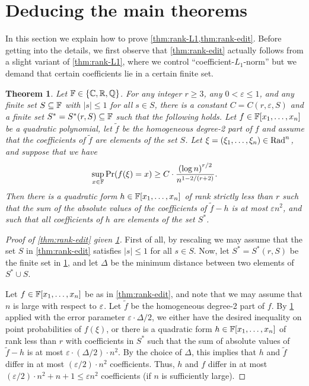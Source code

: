 \documentclass{daj}
\theoremstyle{plain}
\newtheorem{thm}{Theorem}[section]
\theoremstyle{plain}
\theoremstyle{plain}
\theoremstyle{plain}
\theoremstyle{definition}
\theoremstyle{plain}
\theoremstyle{plain}
\theoremstyle{definition}
\theoremstyle{definition}
\theoremstyle{plain}
\let\originalleft\left
\let\originalright\right
\renewcommand{\left}{\mathopen{}\mathclose\bgroup\originalleft}
\renewcommand{\right}{\aftergroup\egroup\originalright}
\begin{document}
\section{Deducing the main theorems\label{sec:rank}}

In this section we explain how to prove \cref{thm:rank-L1,thm:rank-edit}. Before getting into the details, we first observe that \cref{thm:rank-edit} actually follows from a slight variant of \cref{thm:rank-L1}, where we control ``coefficient-$L_1$-norm'' but we demand that certain coefficients lie in a certain finite set.

\begin{thm}
\label{thm:rank-L1-set}Let $\mathbb{F}\in \lbrace \mathbb{C},\mathbb{R}, \mathbb{Q}\rbrace$. For any integer $r\geq 3$, any $0< \varepsilon\leq 1$, and any finite set $S\subseteq \mathbb{F}$ with $\vert s\vert\leq 1$ for all $s\in S$, there is a constant $C=C(r,\varepsilon, S)$ and a finite set $S^*=S^*(r, S)\subseteq \mathbb{F}$ such that the following holds. Let $f\in \mathbb{F}[x_1,\dots,x_n]$ be a quadratic polynomial, let $\tilde{f}$ be the homogeneous degree-2 part of $f$ and assume that the coefficients of $\tilde{f}$ are elements of the set $S$. Let $\xi=(\xi_1,\dots,\xi_n)\in \operatorname{Rad}^n$, and suppose that we have
\[\sup_{x\in \FF}\Pr\left(f(\xi)=x\right)\geq C\cdot \frac{\left(\log n\right)^{r/2}}{n^{1-2/\left(r+2\right)}}.\]
Then there is a quadratic form $h\in\FF\left[x_{1},\dots,x_{n}\right]$
of rank strictly less than $r$ such that the sum of the absolute values of the coefficients of $\tilde{f}-h$ is at most $\varepsilon n^2$, and such that all coefficients of $h$ are elements of the set $S^*$.
\end{thm}

\begin{proof}[Proof of \cref{thm:rank-edit} given \cref{thm:rank-L1-set}]
First of all, by rescaling we may assume that the set $S$ in \cref{thm:rank-edit} satisfies $\vert s\vert\leq 1$ for all $s\in S$. Now, let $S^*=S^*(r,S)$ be the finite set in \cref{thm:rank-L1-set}, and let $\Delta$ be the minimum distance between two elements of $S^*\cup S$.

Let $f\in \mathbb{F}[x_1,\dots,x_n]$ be as in \cref{thm:rank-edit}, and note that we may assume that $n$ is large with respect to $\varepsilon$. Let $\tilde{f}$ be the homogeneous degree-2 part of $f$. By \cref{thm:rank-L1-set} applied with the error parameter $\varepsilon\cdot \Delta/2$, we either have the desired inequality on point probabilities of $f(\xi)$, or there is a quadratic form $h\in\FF\left[x_{1},\dots,x_{n}\right]$ of rank less than $r$ with coefficients in $S^*$ such that the sum of absolute values of $\tilde{f}-h$ is at most $\varepsilon\cdot (\Delta/2)\cdot n^2$. By the choice of $\Delta$, this implies that $h$ and $\tilde{f}$ differ in at most $(\varepsilon/2)\cdot n^2$ coefficients. Thus, $h$ and $f$ differ in at most $(\varepsilon/2)\cdot n^2+n+1\leq \varepsilon n^2$ coefficients (if $n$ is sufficiently large).
\end{proof}
\end{document}
